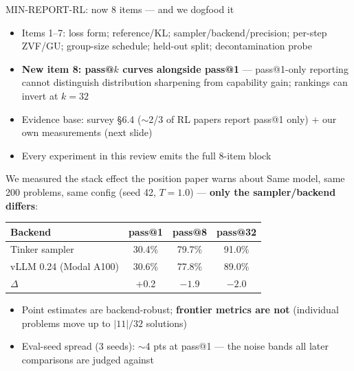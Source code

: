 \documentclass[aspectratio=169,11pt]{beamer}
\newcommand{\good}[1]{\textcolor{green!50!black}{#1}}
\newcommand{\warn}[1]{\textcolor{orange!80!black}{#1}}
\begin{document}
\begin{frame}{MIN-REPORT-RL: now 8 items --- and we dogfood it}
  \begin{itemize}
    \item Items 1--7: loss form; reference/KL; sampler/backend/precision;
          per-step ZVF/GU; group-size schedule; held-out split;
          decontamination probe
    \item \textbf{New item 8: pass@$k$ curves alongside pass@1} ---
          pass@1-only reporting cannot distinguish distribution sharpening
          from capability gain; rankings can invert at $k{=}32$
    \item Evidence base: survey \S6.4 ($\sim$2/3 of RL papers report pass@1
          only) + our own measurements (next slide)
    \item Every experiment in this review emits the full 8-item block
  \end{itemize}
\end{frame}

\begin{frame}{We measured the stack effect the position paper warns about}
  Same model, same 200 problems, same config (seed 42, $T{=}1.0$) ---
  \textbf{only the sampler/backend differs}:
  \vspace{4pt}
  \centering
  \begin{tabular}{@{}lccc@{}}
    \toprule
    Backend & pass@1 & pass@8 & pass@32 \\
    \midrule
    Tinker sampler & 30.4\% & 79.7\% & 91.0\% \\
    vLLM 0.24 (Modal A100) & 30.6\% & 77.8\% & 89.0\% \\
    \midrule
    $\Delta$ & \good{+0.2} & $-1.9$ & \warn{$-2.0$} \\
    \bottomrule
  \end{tabular}
  \vspace{6pt}
  \begin{itemize}
    \item Point estimates are backend-robust; \textbf{frontier metrics are
          not} (individual problems move up to $|11|/32$ solutions)
    \item Eval-seed spread (3 seeds): $\sim$4 pts at pass@1 --- the noise
          bands all later comparisons are judged against
  \end{itemize}
\end{frame}
\end{document}
